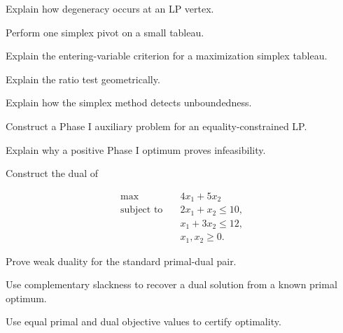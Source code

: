 \begin{exercise}[3]
Explain how degeneracy occurs at an LP vertex.
\end{exercise}

\begin{exercise}[3]
Perform one simplex pivot on a small tableau.
\end{exercise}

\begin{exercise}[3]
Explain the entering-variable criterion for a maximization simplex
tableau.
\end{exercise}

\begin{exercise}[3]
Explain the ratio test geometrically.
\end{exercise}

\begin{exercise}[3]
Explain how the simplex method detects unboundedness.
\end{exercise}

\begin{exercise}[3]
Construct a Phase I auxiliary problem for an equality-constrained LP.
\end{exercise}

\begin{exercise}[3]
Explain why a positive Phase I optimum proves infeasibility.
\end{exercise}

\begin{exercise}[3]
Construct the dual of

\[
\begin{aligned}
\max\quad&
4x_1+5x_2
\\
\text{subject to}\quad&
2x_1+x_2\leq10,
\\
&
x_1+3x_2\leq12,
\\
&
x_1,x_2\geq0.
\end{aligned}
\]
\end{exercise}

\begin{exercise}[3]
Prove weak duality for the standard primal-dual pair.
\end{exercise}

\begin{exercise}[3]
Use complementary slackness to recover a dual solution from a known
primal optimum.
\end{exercise}

\begin{exercise}[3]
Use equal primal and dual objective values to certify optimality.
\end{exercise}

